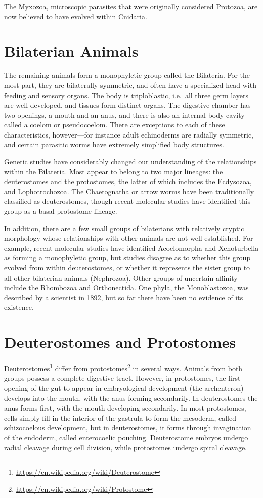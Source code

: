 \documentclass[]{book}
\let\rmarkdownfootnote\footnote%
\def\footnote{\protect\rmarkdownfootnote}
\renewcommand{\href}[2]{#2\footnote{\url{#1}}}
\theoremstyle{definition}
\theoremstyle{definition}
\theoremstyle{definition}
\theoremstyle{remark}
\begin{document}
\begin{enumerate}
The Myxozoa, microscopic parasites that were originally considered
Protozoa, are now believed to have evolved within Cnidaria.

\section{Bilaterian Animals}\label{bilaterian-animals}

The remaining animals form a monophyletic group called the Bilateria.
For the most part, they are bilaterally symmetric, and often have a
specialized head with feeding and sensory organs. The body is
triploblastic, i.e.~all three germ layers are well-developed, and
tissues form distinct organs. The digestive chamber has two openings, a
mouth and an anus, and there is also an internal body cavity called a
coelom or pseudocoelom. There are exceptions to each of these
characteristics, however---for instance adult echinoderms are radially
symmetric, and certain parasitic worms have extremely simplified body
structures.

Genetic studies have considerably changed our understanding of the
relationships within the Bilateria. Most appear to belong to two major
lineages: the deuterostomes and the protostomes, the latter of which
includes the Ecdysozoa, and Lophotrochozoa. The Chaetognatha or arrow
worms have been traditionally classified as deuterostomes, though recent
molecular studies have identified this group as a basal protostome
lineage.

In addition, there are a few small groups of bilaterians with relatively
cryptic morphology whose relationships with other animals are not
well-established. For example, recent molecular studies have identified
Acoelomorpha and Xenoturbella as forming a monophyletic group, but
studies disagree as to whether this group evolved from within
deuterostomes, or whether it represents the sister group to all other
bilaterian animals (Nephrozoa). Other groups of uncertain affinity
include the Rhombozoa and Orthonectida. One phyla, the Monoblastozoa,
was described by a scientist in 1892, but so far there have been no
evidence of its existence.

\section{Deuterostomes and
Protostomes}\label{deuterostomes-and-protostomes}

\href{https://en.wikipedia.org/wiki/Deuterostome}{Deuterostomes} differ
from \href{https://en.wikipedia.org/wiki/Protostome}{protostomes} in
several ways. Animals from both groups possess a complete digestive
tract. However, in protostomes, the first opening of the gut to appear
in embryological development (the archenteron) develops into the mouth,
with the anus forming secondarily. In deuterostomes the anus forms
first, with the mouth developing secondarily. In most protostomes, cells
simply fill in the interior of the gastrula to form the mesoderm, called
schizocoelous development, but in deuterostomes, it forms through
invagination of the endoderm, called enterocoelic pouching. Deuterostome
embryos undergo radial cleavage during cell division, while protostomes
undergo spiral cleavage.


\end{enumerate}
\end{document}

